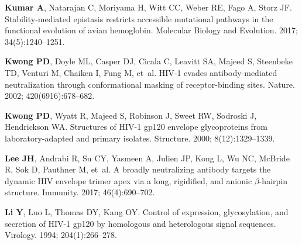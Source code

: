 \documentclass[9pt]{elife}
\begin{document}
\begin{thebibliography}{114}
\textbf{\color{eLifeMediumGrey} Kumar A}, Natarajan C, Moriyama H, Witt CC,
  Weber RE, Fago A, Storz JF.
\newblock Stability-mediated epistasis restricts accessible mutational pathways
  in the functional evolution of avian hemoglobin.
\newblock Molecular Biology and Evolution.  2017; 34(5):1240--1251.

\textbf{\color{eLifeMediumGrey} Kwong PD}, Doyle ML, Casper DJ, Cicala C,
  Leavitt SA, Majeed S, Steenbeke TD, Venturi M, Chaiken I, Fung M, et~al.
\newblock HIV-1 evades antibody-mediated neutralization through conformational
  masking of receptor-binding sites.
\newblock Nature.  2002; 420(6916):678--682.

\textbf{\color{eLifeMediumGrey} Kwong PD}, Wyatt R, Majeed S, Robinson J, Sweet
  RW, Sodroski J, Hendrickson WA.
\newblock Structures of HIV-1 gp120 envelope glycoproteins from
  laboratory-adapted and primary isolates.
\newblock Structure.  2000; 8(12):1329--1339.

\textbf{\color{eLifeMediumGrey} Lee JH}, Andrabi R, Su CY, Yasmeen A, Julien
  JP, Kong L, Wu NC, McBride R, Sok D, Pauthner M, et~al.
\newblock A broadly neutralizing antibody targets the dynamic HIV envelope
  trimer apex via a long, rigidified, and anionic $\beta$-hairpin structure.
\newblock Immunity.  2017; 46(4):690--702.

\textbf{\color{eLifeMediumGrey} Li Y}, Luo L, Thomas DY, Kang OY.
\newblock Control of expression, glycosylation, and secretion of HIV-1 gp120 by
  homologous and heterologous signal sequences.
\newblock Virology.  1994; 204(1):266--278.


\end{thebibliography}
\end{document}

